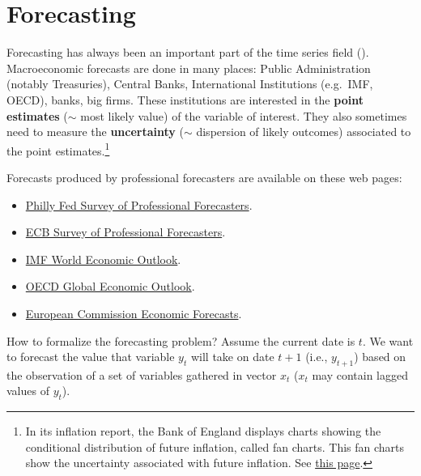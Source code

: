 \documentclass[
  12pt,
]{book}
\providecommand{\tightlist}{%
  \setlength{\itemsep}{0pt}\setlength{\parskip}{0pt}}
\theoremstyle{definition}
\theoremstyle{definition}
\theoremstyle{definition}
\theoremstyle{definition}
\theoremstyle{remark}
\begin{document}
\hypertarget{forecasting}{%
\section{Forecasting}\label{forecasting}}

Forecasting has always been an important part of the time series field (\citet{DEGOOIJER2006443}). Macroeconomic forecasts are done in many places: Public Administration (notably Treasuries), Central Banks, International Institutions (e.g.~IMF, OECD), banks, big firms. These institutions are interested in the \textbf{point estimates} (\(\sim\) most likely value) of the variable of interest. They also sometimes need to measure the \textbf{uncertainty} (\(\sim\) dispersion of likely outcomes) associated to the point estimates.\footnote{In its inflation report, the Bank of England displays charts showing the conditional distribution of future inflation, called fan charts. This fan charts show the uncertainty associated with future inflation. See \href{https://www.bankofengland.co.uk/quarterly-bulletin/1998/q1/the-inflation-report-projections-understanding-the-fan-chart}{this page}.}

Forecasts produced by professional forecasters are available on these web pages:

\begin{itemize}
\tightlist
\item
  \href{https://www.philadelphiafed.org/research-and-data/real-time-center/survey-of-professional-forecasters/}{Philly Fed Survey of Professional Forecasters}.
\item
  \href{http://www.ecb.europa.eu/stats/prices/indic/forecast/html/index.en.html}{ECB Survey of Professional Forecasters}.
\item
  \href{https://www.imf.org/external/pubs/ft/weo/2016/update/01/}{IMF World Economic Outlook}.
\item
  \href{http://www.oecd.org/eco/economicoutlook.htm}{OECD Global Economic Outlook}.
\item
  \href{http://ec.europa.eu/economy_finance/eu/forecasts/index_en.htm}{European Commission Economic Forecasts}.
\end{itemize}

How to formalize the forecasting problem? Assume the current date is \(t\). We want to forecast the value that variable \(y_t\) will take on date \(t+1\) (i.e., \(y_{t+1}\)) based on the observation of a set of variables gathered in vector \(x_t\) (\(x_t\) may contain lagged values of \(y_t\)).
\end{document}
